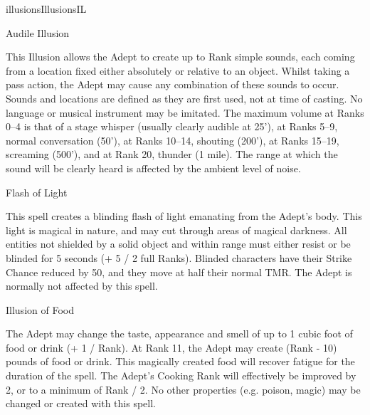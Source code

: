 \begin{College}[1.5]{illusions}{Illusions}{IL}
\begin{spell}[G-1]{Audile Illusion}
\begin{effects}
This Illusion allows the Adept to create up to Rank simple sounds,
each coming from a location fixed either absolutely or relative to an
object.  Whilst taking a pass action, the Adept may cause any
combination of these sounds to occur.  Sounds and locations are
defined as they are first used, not at time of casting.  No language
or musical instrument may be imitated.  The maximum volume at Ranks
0--4 is that of a stage whisper (usually clearly audible at 25’), at
Ranks 5--9, normal conversation (50’), at Ranks 10–14, shouting
(200’), at Ranks 15–19, screaming (500’), and at Rank 20, thunder (1
mile). The range at which the sound will be clearly heard is affected
by the ambient level of noise.
\end{effects}
\end{spell}

\begin{spell}[G-2]{Flash of Light}

\begin{effects}
This spell creates a blinding flash of light emanating from the
Adept’s body.  This light is magical in nature, and may cut through
areas of magical darkness.  All entities not shielded by a solid
object and within range must either resist or be blinded for 5 seconds
(+ 5 / 2 full Ranks).  Blinded characters have their Strike Chance
reduced by 50, and they move at half their normal TMR.  The Adept is
normally not affected by this spell.
\end{effects}
\end{spell}

\begin{spell}[G-3]{Illusion of Food}

\begin{effects}
The Adept may change the taste, appearance and smell of up to 1 cubic
foot of food or drink (+ 1 / Rank).  At Rank 11, the Adept may create
(Rank - 10) pounds of food or drink.  This magically created food will
recover fatigue for the duration of the spell.  The Adept’s Cooking
Rank will effectively be improved by 2, or to a minimum of Rank / 2.
No other properties (e.g.  poison, magic) may be changed or created
with this spell.
\end{effects}
\end{spell}


\end{College}
